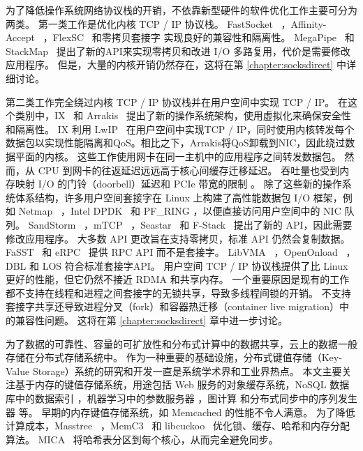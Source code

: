 为了降低操作系统网络协议栈的开销，不依靠新型硬件的软件优化工作主要可分为两类。
第一类工作是优化内核 TCP / IP 协议栈。 FastSocket~ \cite {lin2016scalable}，Affinity-Accept~ \cite {pesterev2012improving}，FlexSC~ \cite {soares2010flexsc} 和零拷贝套接字 \cite {thadani1995efficient,chu1996zero,linux-zero-copy} 实现良好的兼容性和隔离性。
MegaPipe~ \cite {han2012megapipe} 和StackMap~ \cite {yasukata2016stackmap} 提出了新的API来实现零拷贝和改进 I/O 多路复用，代价是需要修改应用程序。
但是，大量的内核开销仍然存在，这将在第 \ref {chapter:socksdirect} 中详细讨论。

第二类工作完全绕过内核 TCP / IP 协议栈并在用户空间中实现 TCP / IP。
在这个类别中，IX~ \cite {belay2017ix} 和 Arrakis~\cite {peter2016arrakis} 提出了新的操作系统架构，使用虚拟化来确保安全性和隔离性。
IX 利用 LwIP~ \cite {dunkels2001design} 在用户空间中实现TCP / IP，同时使用内核转发每个数据包以实现性能隔离和QoS。相比之下，Arrakis将QoS卸载到NIC，因此绕过数据平面的内核。
这些工作使用网卡在同一主机中的应用程序之间转发数据包。
然而，从 CPU 到网卡的往返延迟远远高于核心间缓存迁移延迟。
吞吐量也受到内存映射 I/O 的门铃（doorbell）延迟和 PCIe 带宽的限制 \cite {neugebauer2018understanding,li2017kv}。
除了这些新的操作系统体系结构，许多用户空间套接字在 Linux 上构建了高性能数据包 I/O 框架，例如 Netmap~ \cite {rizzo2012netmap}，Intel DPDK~ \cite {dpdk} 和 PF\_RING \cite {pf-ring}，以便直接访问用户空间中的 NIC 队列。
SandStorm~ \cite {marinos2014network}，mTCP~ \cite {jeong2014mtcp}，Seastar~ \cite {seastar} 和 F-Stack~ \cite {fstack}提出了新的 API，因此需要修改应用程序。
大多数 API 更改旨在支持零拷贝，标准 API 仍然会复制数据。
FaSST~ \cite {kalia2016fasst} 和 eRPC~ \cite {kalia2018datacenter} 提供 RPC API 而不是套接字。
LibVMA~ \cite {libvma}，OpenOnload~ \cite {openonload}，DBL \cite {dbl} 和 LOS \cite {huang2017high}符合标准套接字API。
用户空间 TCP / IP 协议栈提供了比 Linux 更好的性能，但它仍然不接近 RDMA 和共享内存。
一个重要原因是现有的工作都不支持在线程和进程之间套接字的无锁共享，导致多线程间锁的开销。
不支持套接字共享还导致进程分叉（fork）和容器热迁移（container live migration）中的兼容性问题。
这将在第 \ref{chapter:socksdirect} 章中进一步讨论。

为了数据的可靠性、容量的可扩放性和分布式计算中的数据共享，云上的数据一般存储在分布式存储系统中。
作为一种重要的基础设施，分布式键值存储（Key-Value Storage）系统的研究和开发一直是系统学术界和工业界热点。
本文主要关注基于内存的键值存储系统，用途包括 Web 服务的对象缓存系统，NoSQL 数据库中的数据索引 \cite {chang2008bigtable}，机器学习中的参数服务器 \cite {li2014scaling}，图计算 \cite {shao2013trinity,xiao17tux2} 和分布式同步中的序列发生器 \cite {kalia2016design,eris} 等。
早期的内存键值存储系统，如 Memcached \cite{memcached} 的性能不令人满意。
为了降低计算成本，Masstree~ \cite {mao2012cache}，MemC3~ \cite {fan2013memc3} 和 libcuckoo~ \cite {li2014algorithmic} 优化锁、缓存、哈希和内存分配算法。
MICA~ \cite {lim2014mica} 将哈希表分区到每个核心，从而完全避免同步。

